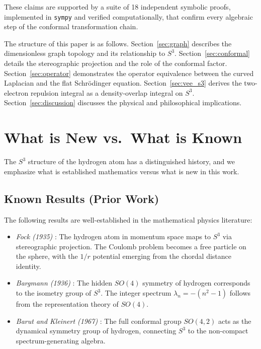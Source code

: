 \documentclass[aps,pra,twocolumn,superscriptaddress,longbibliography]{revtex4-2}
\begin{document}
These claims are supported by a suite of 18 independent symbolic proofs, implemented in \texttt{sympy} and verified computationally, that confirm every algebraic step of the conformal transformation chain.

The structure of this paper is as follows. Section~\ref{sec:graph} describes the dimensionless graph topology and its relationship to $S^3$. Section~\ref{sec:conformal} details the stereographic projection and the role of the conformal factor. Section~\ref{sec:operator} demonstrates the operator equivalence between the curved Laplacian and the flat Schr\"odinger equation. Section~\ref{sec:vee_s3} derives the two-electron repulsion integral as a density-overlap integral on $S^3$. Section~\ref{sec:discussion} discusses the physical and philosophical implications.


\section{What is New vs.\ What is Known}
\label{sec:attribution}

The $S^3$ structure of the hydrogen atom has a distinguished history, and we emphasize what is established mathematics versus what is new in this work.

\subsection{Known Results (Prior Work)}

The following results are well-established in the mathematical physics literature:

\begin{itemize}
\item \textit{Fock (1935)} \cite{fock1935}: The hydrogen atom in momentum space maps to $S^3$ via stereographic projection. The Coulomb problem becomes a free particle on the sphere, with the $1/r$ potential emerging from the chordal distance identity.

\item \textit{Bargmann (1936)} \cite{bargmann1936}: The hidden $SO(4)$ symmetry of hydrogen corresponds to the isometry group of $S^3$. The integer spectrum $\lambda_n = -(n^2 - 1)$ follows from the representation theory of $SO(4)$.

\item \textit{Barut and Kleinert (1967)} \cite{barut1967}: The full conformal group $SO(4,2)$ acts as the dynamical symmetry group of hydrogen, connecting $S^3$ to the non-compact spectrum-generating algebra.
\end{itemize}
\end{document}
